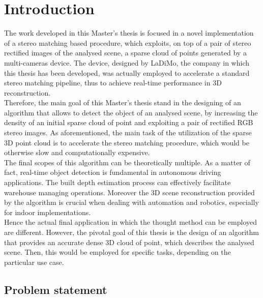 \chapter{Introduction}
\label{chapter:intro}

The work developed in this Master's thesis is focused in a novel implementation of a stereo matching based procedure, which exploits, on top of a pair of stereo rectified images of the analysed scene, a sparse cloud of points generated by a multi-cameras device.
The device, designed by LaDiMo, the company in which this thesis has been developed, was actually employed to accelerate a standard stereo matching pipeline, thus to achieve real-time performance in 3D reconstruction. \\
Therefore, the main goal of this Master's thesis stand in the designing of an algorithm that allows to detect the object of an analysed scene, by increasing the density of an initial sparse cloud of point and exploiting a pair of rectified RGB stereo images.
As aforementioned, the main task of the utilization of the sparse 3D point cloud is to accelerate the stereo matching procedure, which would be otherwise slow and computationally expensive. \\
The final scopes of this algorithm can be theoretically multiple.
As a matter of fact, real-time object detection is fundamental in autonomous driving applications. 
The built depth estimation process can effectively facilitate warehouse managing operations.
Moreover the 3D scene reconstruction provided by the algorithm is crucial when dealing with automation and robotics, especially for indoor implementations.\\
Hence the actual final application in which the thought method can be employed are different.
However, the pivotal goal of this thesis is the design of an algorithm that provides an accurate dense 3D cloud of point, which describes the analysed scene.
Then, this would be employed for specific tasks, depending on the particular use case.

\section{Problem statement}
\label{sec:problem-statement}


